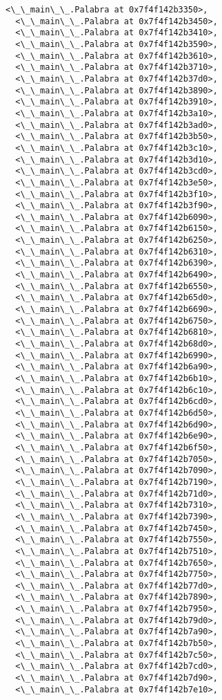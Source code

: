 \documentclass[12pt,a4paper,table]{article}
\begin{document}
\begin{tcolorbox}[breakable, size=fbox, boxrule=.5pt, pad at break*=1mm, opacityfill=0]
\begin{Verbatim}[commandchars=\\\{\}]
  <\_\_main\_\_.Palabra at 0x7f4f142b3350>,
  <\_\_main\_\_.Palabra at 0x7f4f142b3450>,
  <\_\_main\_\_.Palabra at 0x7f4f142b3410>,
  <\_\_main\_\_.Palabra at 0x7f4f142b3590>,
  <\_\_main\_\_.Palabra at 0x7f4f142b3610>,
  <\_\_main\_\_.Palabra at 0x7f4f142b3710>,
  <\_\_main\_\_.Palabra at 0x7f4f142b37d0>,
  <\_\_main\_\_.Palabra at 0x7f4f142b3890>,
  <\_\_main\_\_.Palabra at 0x7f4f142b3910>,
  <\_\_main\_\_.Palabra at 0x7f4f142b3a10>,
  <\_\_main\_\_.Palabra at 0x7f4f142b3ad0>,
  <\_\_main\_\_.Palabra at 0x7f4f142b3b50>,
  <\_\_main\_\_.Palabra at 0x7f4f142b3c10>,
  <\_\_main\_\_.Palabra at 0x7f4f142b3d10>,
  <\_\_main\_\_.Palabra at 0x7f4f142b3cd0>,
  <\_\_main\_\_.Palabra at 0x7f4f142b3e50>,
  <\_\_main\_\_.Palabra at 0x7f4f142b3f10>,
  <\_\_main\_\_.Palabra at 0x7f4f142b3f90>,
  <\_\_main\_\_.Palabra at 0x7f4f142b6090>,
  <\_\_main\_\_.Palabra at 0x7f4f142b6150>,
  <\_\_main\_\_.Palabra at 0x7f4f142b6250>,
  <\_\_main\_\_.Palabra at 0x7f4f142b6310>,
  <\_\_main\_\_.Palabra at 0x7f4f142b6390>,
  <\_\_main\_\_.Palabra at 0x7f4f142b6490>,
  <\_\_main\_\_.Palabra at 0x7f4f142b6550>,
  <\_\_main\_\_.Palabra at 0x7f4f142b65d0>,
  <\_\_main\_\_.Palabra at 0x7f4f142b6690>,
  <\_\_main\_\_.Palabra at 0x7f4f142b6750>,
  <\_\_main\_\_.Palabra at 0x7f4f142b6810>,
  <\_\_main\_\_.Palabra at 0x7f4f142b68d0>,
  <\_\_main\_\_.Palabra at 0x7f4f142b6990>,
  <\_\_main\_\_.Palabra at 0x7f4f142b6a90>,
  <\_\_main\_\_.Palabra at 0x7f4f142b6b10>,
  <\_\_main\_\_.Palabra at 0x7f4f142b6c10>,
  <\_\_main\_\_.Palabra at 0x7f4f142b6cd0>,
  <\_\_main\_\_.Palabra at 0x7f4f142b6d50>,
  <\_\_main\_\_.Palabra at 0x7f4f142b6d90>,
  <\_\_main\_\_.Palabra at 0x7f4f142b6e90>,
  <\_\_main\_\_.Palabra at 0x7f4f142b6f50>,
  <\_\_main\_\_.Palabra at 0x7f4f142b7050>,
  <\_\_main\_\_.Palabra at 0x7f4f142b7090>,
  <\_\_main\_\_.Palabra at 0x7f4f142b7190>,
  <\_\_main\_\_.Palabra at 0x7f4f142b71d0>,
  <\_\_main\_\_.Palabra at 0x7f4f142b7310>,
  <\_\_main\_\_.Palabra at 0x7f4f142b7390>,
  <\_\_main\_\_.Palabra at 0x7f4f142b7450>,
  <\_\_main\_\_.Palabra at 0x7f4f142b7550>,
  <\_\_main\_\_.Palabra at 0x7f4f142b7510>,
  <\_\_main\_\_.Palabra at 0x7f4f142b7650>,
  <\_\_main\_\_.Palabra at 0x7f4f142b7750>,
  <\_\_main\_\_.Palabra at 0x7f4f142b77d0>,
  <\_\_main\_\_.Palabra at 0x7f4f142b7890>,
  <\_\_main\_\_.Palabra at 0x7f4f142b7950>,
  <\_\_main\_\_.Palabra at 0x7f4f142b79d0>,
  <\_\_main\_\_.Palabra at 0x7f4f142b7a90>,
  <\_\_main\_\_.Palabra at 0x7f4f142b7b50>,
  <\_\_main\_\_.Palabra at 0x7f4f142b7c50>,
  <\_\_main\_\_.Palabra at 0x7f4f142b7cd0>,
  <\_\_main\_\_.Palabra at 0x7f4f142b7d90>,
  <\_\_main\_\_.Palabra at 0x7f4f142b7e10>,

\end{Verbatim}
\end{tcolorbox}
\end{document}
